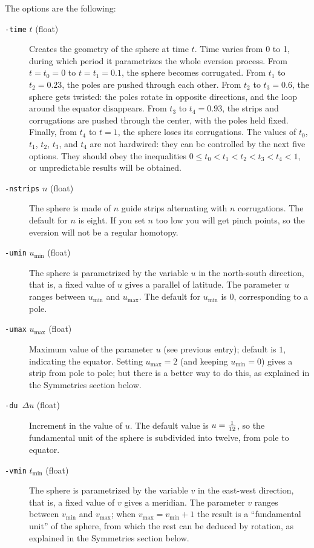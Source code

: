 The options are the following:

\begin{description} 
\item[{\tt-time} $t$ (float)]
Creates the geometry of the sphere at time $t$. Time varies from 0 to 1, during which period it parametrizes the whole eversion process.
From $t=t_0=0$ to $t=t_1=0.1$, the sphere becomes corrugated. From $t_1$ to $t_2=0.23$, the poles are pushed through each other. From
$t_2$ to $t_3=0.6$, the sphere gets twisted: the poles rotate in opposite directions, and the loop around the equator disappears. From
$t_3$ to $t_4=0.93$, the strips and corrugations are pushed through the center, with the poles held fixed. Finally, from $t_4$ to $t=1$,
the sphere loses its corrugations. The values of $t_0$, $t_1$, $t_2$, $t_3$, and $t_4$ are not hardwired: they can be controlled by the next
five options. They should obey the inequalities $0\le t_0<t_1<t_2<t_3<t_4<1$, or unpredictable results will be obtained.

\item[{\tt-nstrips} $n$ (float)]
The sphere is made of $n$ guide strips alternating with $n$ corrugations. The default for $n$ is eight.
If you set $n$ too low you will get pinch points, so the eversion will not be a regular homotopy.

\item[{\tt-umin} $u_{\min}$ (float)]
The sphere is parametrized by the variable $u$ in the north-south direction, that is, a fixed value of $u$ gives a parallel of latitude.
The parameter $u$ ranges between $u_{\min}$ and $u_{\max}$. The default for $u_{\min}$ is 0, corresponding to a pole.

\item[{\tt-umax} $u_{\max}$ (float)]
Maximum value of the parameter $u$ (see previous entry); default is $1$, indicating the equator. Setting $u_{\max}=2$ (and keeping
$u_{\min}=0$) gives a strip from pole to pole; but there is a better way to do this, as explained in the Symmetries section below.

\item[{\tt-du} $\,\Delta u$ (float)]
Increment in the value of $u$. The default value is $u={1\over12}$, so the fundamental unit of the sphere is subdivided into twelve, from pole to equator.

\item[{\tt-vmin} $t_{\min}$ (float)]
The sphere is parametrized by the variable $v$ in the east-west direction, that is, a fixed value of $v$ gives a meridian. The
parameter $v$ ranges between $v_{\min}$ and $v_{\max}$; when $v_{\max}=v_{\min}+1$ the result is a ``fundamental unit'' of the sphere,
from which the rest can be deduced by rotation, as explained in the Symmetries section below.


\end{description}
